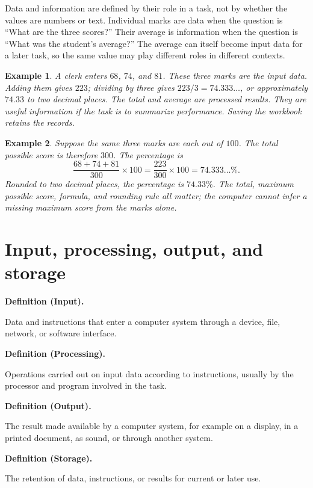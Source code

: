 \documentclass[11pt]{article}
\newtheorem{example}{Example}[section]
\newenvironment{definitionbox}[1]{%
  \par\noindent\textbf{Definition (#1).}\ \itshape
}{\par\vspace{0.3em}}
\begin{document}
Data and information are defined by their role in a task, not by whether the
values are numbers or text. Individual marks are data when the question is
``What are the three scores?'' Their average is information when the question
is ``What was the student's average?'' The average can itself become input
data for a later task, so the same value may play different roles in
different contexts.

\begin{example}
A clerk enters $68$, $74$, and $81$. These three marks are the input data.
Adding them gives $223$; dividing by three gives
$223/3=74.333\ldots$, or approximately $74.33$ to two decimal places. The
total and average are processed results. They are useful information if the
task is to summarize performance. Saving the workbook retains the records.
\end{example}

\begin{example}
Suppose the same three marks are each out of $100$. The total possible score
is therefore $300$. The percentage is
\[
  \frac{68+74+81}{300}\times 100
  =\frac{223}{300}\times 100
  =74.333\ldots\%.
\]
Rounded to two decimal places, the percentage is $74.33\%$. The total,
maximum possible score, formula, and rounding rule all matter; the computer
cannot infer a missing maximum score from the marks alone.
\end{example}

\section{Input, processing, output, and storage}
\begin{definitionbox}{Input}
Data and instructions that enter a computer system through a device, file,
network, or software interface.
\end{definitionbox}

\begin{definitionbox}{Processing}
Operations carried out on input data according to instructions, usually by
the processor and program involved in the task.
\end{definitionbox}

\begin{definitionbox}{Output}
The result made available by a computer system, for example on a display, in
a printed document, as sound, or through another system.
\end{definitionbox}

\begin{definitionbox}{Storage}
The retention of data, instructions, or results for current or later use.
\end{definitionbox}
\end{document}
